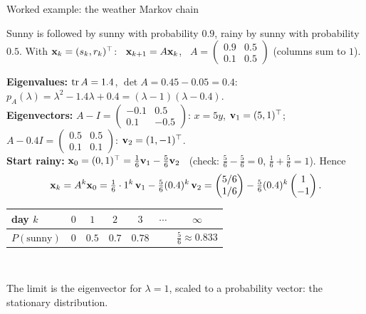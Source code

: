 \documentclass[aspectratio=1610,11pt]{beamer}
\begin{document}
\begin{frame}{Worked example: the weather Markov chain}
    \begin{example}
        \small Sunny is followed by sunny with probability $0.9$, rainy by sunny with probability $0.5$. With $\mathbf{x}_k = (s_k, r_k)^\top$: \ $\mathbf{x}_{k+1} = A\mathbf{x}_k$, \ $A = \begin{pmatrix} 0.9 & 0.5 \\ 0.1 & 0.5 \end{pmatrix}$ (columns sum to $1$).
    \end{example}
    \small
    \textbf{Eigenvalues:} $\operatorname{tr} A = 1.4$, $\det A = 0.45 - 0.05 = 0.4$: \ $p_A(\lambda) = \lambda^2 - 1.4\lambda + 0.4 = (\lambda - 1)(\lambda - 0.4)$.
    \\[0.2em]
    \textbf{Eigenvectors:} $A - I = \begin{pmatrix} -0.1 & 0.5 \\ 0.1 & -0.5 \end{pmatrix}$: $x = 5y$, $\mathbf{v}_1 = (5, 1)^\top$; \ $A - 0.4I = \begin{pmatrix} 0.5 & 0.5 \\ 0.1 & 0.1 \end{pmatrix}$: $\mathbf{v}_2 = (1, -1)^\top$.
    \\[0.2em]
    \textbf{Start rainy:} $\mathbf{x}_0 = (0, 1)^\top = \tfrac{1}{6}\mathbf{v}_1 - \tfrac{5}{6}\mathbf{v}_2$ \ (check: $\frac{5}{6} - \frac{5}{6} = 0$, $\frac{1}{6} + \frac{5}{6} = 1$). Hence
    \[\mathbf{x}_k = A^k\mathbf{x}_0 = \tfrac{1}{6}\cdot 1^k\,\mathbf{v}_1 - \tfrac{5}{6}(0.4)^k\,\mathbf{v}_2 = \begin{pmatrix} 5/6 \\ 1/6 \end{pmatrix} - \tfrac{5}{6}(0.4)^k\begin{pmatrix} 1 \\ -1 \end{pmatrix}.\]
    \renewcommand{\arraystretch}{1.1}
    \centering
    \begin{tabular}{@{}lcccccc@{}}
        \toprule
        day $k$ & $0$ & $1$ & $2$ & $3$ & $\cdots$ & $\infty$ \\
        \midrule
        $P(\text{sunny})$ & $0$ & $0.5$ & $0.7$ & $0.78$ & & $\frac{5}{6} \approx 0.833$ \\
        \bottomrule
    \end{tabular}
    \\[0.2em]
    \raggedright The limit is the eigenvector for $\lambda = 1$, scaled to a probability vector: the stationary distribution.
\end{frame}
\end{document}
